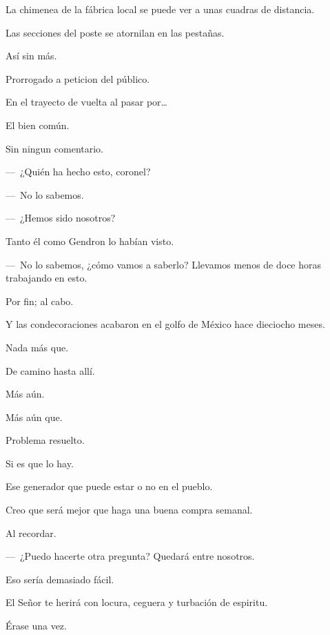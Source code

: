 \sk
La chimenea de la fábrica local se puede ver a unas cuadras de distancia. 

\sk
Las secciones del poste se atornilan en las pestañas.

\sk
Así sin más. 

\sk
Prorrogado a peticion del público. 

\sk
En el trayecto de vuelta al pasar por\ldots{} 

\sk
El bien común. 

\sk
Sin ningun comentario.

\sk
---~¿Quién ha hecho esto, coronel?

---~No lo sabemos.

---~¿Hemos sido nosotros?

\sk
Tanto él como Gendron lo habían visto.

\sk
---~No lo sabemos, ¿cómo vamos a saberlo? Llevamos menos de doce horas trabajando en esto.

\sk
Por fin; al cabo. 

\sk
Y las condecoraciones acabaron en el golfo de México hace dieciocho meses. 

\sk
Nada más que. 

\sk
De camino hasta allí. 

\sk
Más aún. 

\sk
Más aún que. 

\sk
Problema resuelto.

\sk
Si es que lo hay. 

\sk
Ese generador que puede estar o no en el pueblo.

\sk
Creo que será mejor que haga una buena compra semanal.

\sk
Al recordar. 

\sk
---~¿Puedo hacerte otra pregunta? Quedará entre nosotros. 

\sk
Eso sería demasiado fácil.

\sk
El Señor te herirá con locura, ceguera y turbación de espiritu. 

\sk
Érase una vez. 

